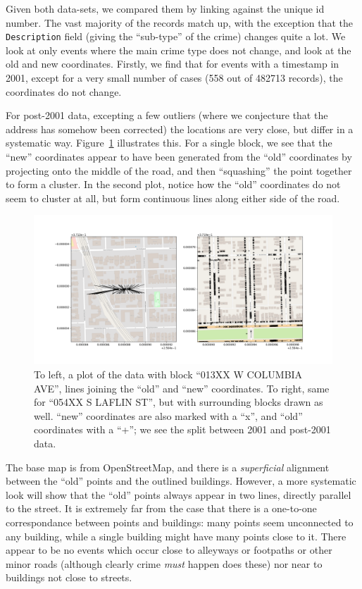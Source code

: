 \documentclass[twoside,a4paper,twocolumn,10pt]{article}
\theoremstyle{plain}
\theoremstyle{definition}
\begin{document}
Given both data-sets, we compared them by linking against the unique id number.  The vast majority
of the records match up, with the exception that the \texttt{Description} field (giving the
``sub-type'' of the crime) changes quite a lot.  We look at only events where the main crime
type does not change, and look at the old and new coordinates.  Firstly, we find that for
events with a timestamp in 2001, except for a very small number of cases
(558 out of 482713 records), the coordinates do not change.

For post-2001 data, excepting a few outliers
(where we conjecture that the address has somehow been corrected) the locations are very close,
but differ in a systematic way.  Figure~\ref{fig:three} illustrates this.  For a single block,
we see that the ``new'' coordinates appear to have been generated from the ``old'' coordinates
by projecting onto the middle of the road, and then ``squashing'' the point together to form
a cluster.  In the second plot, notice how the ``old'' coordinates do not seem to cluster at
all, but form continuous lines along either side of the road.

\begin{figure}
  \includegraphics[width=\textwidth]{Chicago_example1.png}
  \caption{To left, a plot of the data with block ``013XX W COLUMBIA AVE'', lines joining the
``old'' and ``new'' coordinates.  To right, same for ``054XX S LAFLIN ST'', but with surrounding
blocks drawn as well.  ``new'' coordinates are also marked with a ``x'', and ``old'' coordinates
with a ``+''; we see the split between 2001 and post-2001 data.}
  \label{fig:three}
\end{figure}

The base map is from OpenStreetMap, and there is a \emph{superficial} alignment between the
``old'' points and the outlined buildings.  However, a more systematic look will show that the
``old'' points always appear in two lines, directly parallel to the street.  It is extremely
far from the case that there is a one-to-one correspondance between points and buildings:
many points seem unconnected to any building, while a single building might have many points
close to it.  There appear to be no events which occur close to alleyways or footpaths or other
minor roads (although clearly crime \emph{must} happen does these) nor near to buildings not
close to streets.
\end{document}
